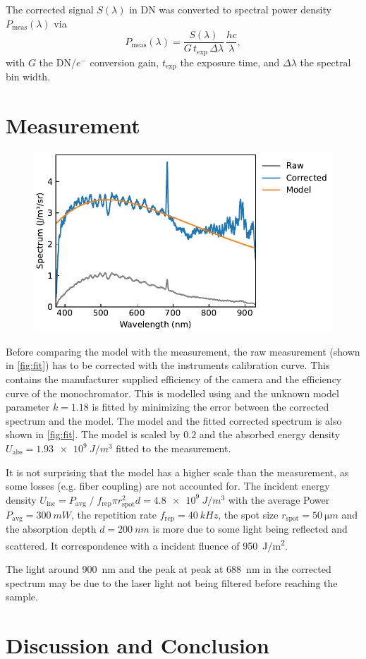\documentclass[
	a4paper,
]{scrarticle}
\begin{document}
The corrected signal \(S(\lambda)\) in DN was converted to spectral power density \(P_{\text{meas}}(\lambda)\) via
\begin{equation}
  P_{\text{meas}}(\lambda)
  = \frac{S(\lambda)}{G\,t_{\text{exp}}\,\Delta\lambda}\,\frac{hc}{\lambda},
\end{equation}
with \(G\) the DN/\(e^-\) conversion gain, \(t_{\text{exp}}\) the exposure time, and \(\Delta\lambda\) the spectral bin width.  

\clearpage
\section{Measurement}
\begin{figure}[h]
    \centering
    \includegraphics{../analysis/figures/combined.fit.pdf}
    \caption{}
    \label{fig:fit}
\end{figure}
Before comparing the model with the measurement, the raw measurement (shown in \autoref{fig:fit}) has to be corrected with the instruments calibration curve.
This contains the manufacturer supplied efficiency of the camera \cite{andorIXonEM897Manual} and the efficiency curve of the monochromator.
This is modelled using \autocite{barkerRippleCorrectionHighdispersion1984} and the unknown model parameter $k=1.18$ is fitted by minimizing the error between the corrected spectrum and the model.
The model and the fitted corrected spectrum is also shown in \autoref{fig:fit}.
The model is scaled by $0.2$ and the absorbed energy density $U_\text{abs} = \SI{1.93e9}{J/m^3}$ fitted to the measurement.

It is not surprising that the model has a higher scale than the measurement, as some losses (e.g. fiber coupling) are not accounted for.
The incident energy density $U_\text{inc} = P_\text{avg} \; / \; f_\text{rep} \pi r_\text{spot}^2 d = \SI{4.8e9}{J/m^3}$ with the average Power $P_\text{avg}=\SI{300}{mW}$, the repetition rate $f_\text{rep}=\SI{40}{kHz}$, the spot size $r_\text{spot}=\SI{50}{\micro m}$ and the absorption depth $d=\SI{200}{nm}$ \cite{smauszDeterminationUVVisible2017} is more due to some light being reflected and scattered. It correspondence with a incident fluence of \SI{950}{J/m^2}. 

The light around \SI{900}{nm} and the peak at peak at \SI{688}{nm} in the corrected spectrum may be due to the laser light not being filtered before reaching the sample.

\section{Discussion and Conclusion}

\clearpage
\printbibliography
\end{document}
